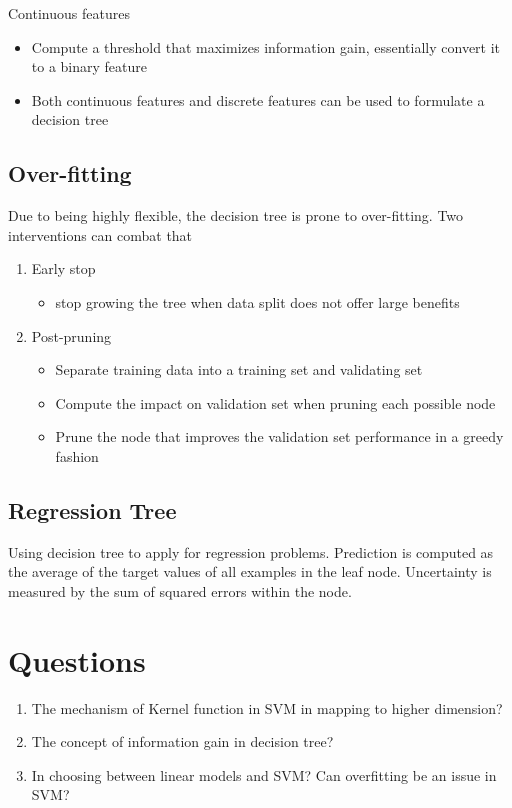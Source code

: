 \documentclass[11pt]{article}
\begin{document}
Continuous features
\begin{itemize}
\item Compute a threshold that maximizes information gain, essentially convert it to a binary feature
\item Both continuous features and discrete features can be used to formulate a decision tree
\end{itemize}

\subsection{Over-fitting}
\label{sec:org5aa427a}
Due to being highly flexible, the decision tree is prone to over-fitting. Two interventions can combat that
\begin{enumerate}
\item Early stop
\begin{itemize}
\item stop growing the tree when data split does not offer large benefits
\end{itemize}
\item Post-pruning
\begin{itemize}
\item Separate training data into a training set and validating set
\item Compute the impact on validation set when pruning each possible node
\item Prune the node that improves the validation set performance in a greedy fashion
\end{itemize}
\end{enumerate}

\subsection{Regression Tree}
\label{sec:org7ff76ff}
Using decision tree to apply for regression problems. Prediction is computed as the average of the target values of all examples in the leaf node. Uncertainty is measured by the sum of squared errors within the node.

\section{Questions}
\label{sec:orgc4f1f9a}
\begin{enumerate}
\item The mechanism of Kernel function in SVM in mapping to higher dimension?
\item The concept of information gain in decision tree?
\item In choosing between linear models and SVM? Can overfitting be an issue in SVM?
\end{enumerate}
\end{document}

